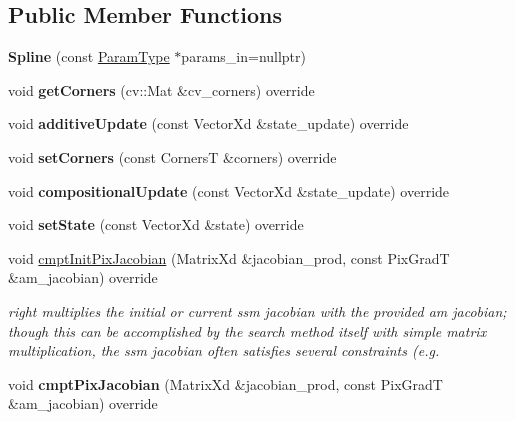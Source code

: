\subsection*{Public Member Functions}
\begin{DoxyCompactItemize}
\item 
\hypertarget{classSpline_acad7c3aa0ecd69df6609beb564dec5b0}{{\bfseries Spline} (const \hyperlink{structSplineParams}{Param\-Type} $\ast$params\-\_\-in=nullptr)}\label{classSpline_acad7c3aa0ecd69df6609beb564dec5b0}

\item 
\hypertarget{classSpline_aa6c4e3998e70799d52f4a615de997174}{void {\bfseries get\-Corners} (cv\-::\-Mat \&cv\-\_\-corners) override}\label{classSpline_aa6c4e3998e70799d52f4a615de997174}

\item 
\hypertarget{classSpline_a99960557ba1b57bb76f486858335abd2}{void {\bfseries additive\-Update} (const Vector\-Xd \&state\-\_\-update) override}\label{classSpline_a99960557ba1b57bb76f486858335abd2}

\item 
\hypertarget{classSpline_af557b853a13e3bab11d96f39de87f3f8}{void {\bfseries set\-Corners} (const Corners\-T \&corners) override}\label{classSpline_af557b853a13e3bab11d96f39de87f3f8}

\item 
\hypertarget{classSpline_a349b75206c9b5d42619649b9127d560b}{void {\bfseries compositional\-Update} (const Vector\-Xd \&state\-\_\-update) override}\label{classSpline_a349b75206c9b5d42619649b9127d560b}

\item 
\hypertarget{classSpline_a1041a95d409d6ba01779622c6bc9d2d7}{void {\bfseries set\-State} (const Vector\-Xd \&state) override}\label{classSpline_a1041a95d409d6ba01779622c6bc9d2d7}

\item 
void \hyperlink{classSpline_a8db3ad0a056e94f2adc7503677fd1675}{cmpt\-Init\-Pix\-Jacobian} (Matrix\-Xd \&jacobian\-\_\-prod, const Pix\-Grad\-T \&am\-\_\-jacobian) override
\begin{DoxyCompactList}\small\item\em right multiplies the initial or current ssm jacobian with the provided am jacobian; though this can be accomplished by the search method itself with simple matrix multiplication, the ssm jacobian often satisfies several constraints (e.\-g. \end{DoxyCompactList}\item 
\hypertarget{classSpline_a1e2a7c4ae5aae46b85f8ab57a3e54b73}{void {\bfseries cmpt\-Pix\-Jacobian} (Matrix\-Xd \&jacobian\-\_\-prod, const Pix\-Grad\-T \&am\-\_\-jacobian) override}\label{classSpline_a1e2a7c4ae5aae46b85f8ab57a3e54b73}


\end{DoxyCompactItemize}
